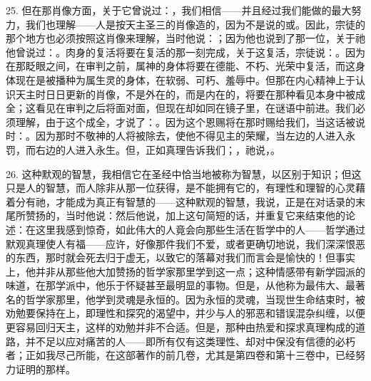 25. 但在那肖像方面，关于它曾说过：，我们相信——并且经过我们能做的最大努力，我们也理解——人是按天主圣三的肖像造的，因为不是说的或。因此，宗徒的那个地方也必须按照这肖像来理解，当时他说：；因为他也说到了那一位，关于祂他曾说过：。肉身的复活将要在复活的那一刻完成，关于这复活，宗徒说：。因为在那眨眼之间，在审判之前，属神的身体将要在德能、不朽、光荣中复活，而这身体现在是被播种为属生灵的身体，在软弱、可朽、羞辱中。但那在内心精神上于认识天主时日日更新的肖像，不是外在的，而是内在的，将要在那种看见本身中被成全；这看见在审判之后将面对面，但现在却如同在镜子里，在谜语中前进。我们必须理解，由于这个成全，才说了：。因为这个恩赐将在那时赐给我们，当这话被说时：。因为那时不敬神的人将被除去，使他不得见主的荣耀，当左边的人进入永罚，而右边的人进入永生。但，正如真理告诉我们；，祂说，。\par

26. 这种默观的智慧，我相信它在圣经中恰当地被称为智慧，以区别于知识；但这只是人的智慧，而人除非从那一位获得，是不能拥有它的，有理性和理智的心灵藉着分有祂，才能成为真正有智慧的——这种默观的智慧，我说，正是在对话录的末尾所赞扬的，当时他说：然后他说，加上这句简短的话，并重复它来结束他的论述：在这里我感到惊奇，如此伟大的人竟会向那些生活在哲学中的人——哲学通过默观真理使人有福——应许，好像那件我们不爱，或者更确切地说，我们深深恨恶的东西，那时就会死去归于虚无，以致它的落幕对我们而言会是愉快的！但事实上，他并非从那些他大加赞扬的哲学家那里学到这一点；这种情感带有新学园派的味道，在那学派中，他乐于怀疑甚至最明显的事物。但是，从他称为最伟大、最著名的哲学家那里，他学到灵魂是永恒的。因为永恒的灵魂，当现世生命结束时，被劝勉要保持在上，即理性和探究的渴望中，并少与人的邪恶和错误混杂纠缠，以便更容易回归天主，这样的劝勉并非不合适。但是，那种由热爱和探求真理构成的道路，并不足以应对痛苦的人——即所有仅有这类理性、却对中保没有信德的必朽者；正如我尽己所能，在这部著作的前几卷，尤其是第四卷和第十三卷中，已经努力证明的那样。\par

